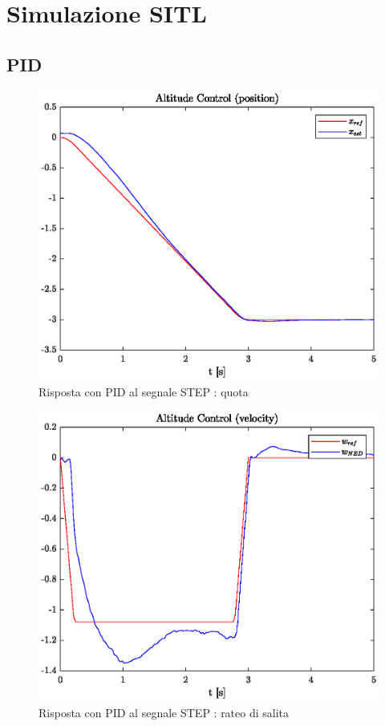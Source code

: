 \section{Simulazione SITL}
\subsection{PID}

\begin{figure}
	\centering
	\includegraphics[width=4\textwidth]{Simulazioni/Figure/STEPaltitudecontrolposPID}
	\caption{Risposta con PID al segnale STEP : quota}
\end{figure}

\begin{figure}
	\centering
	\includegraphics[width=4\textwidth]{Simulazioni/Figure/STEPaltitudecontrolvelPID}
	\caption{Risposta con PID al segnale STEP : rateo di salita}
\end{figure}

